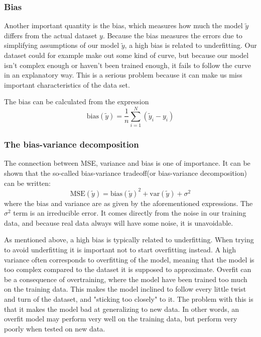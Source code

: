 \documentclass{emulateapj}
\begin{document}
\subsubsection{Bias}
Another important quantity is the bias, which measures how much the model $\tilde{y}$ differs from the actual dataset $y$. Because the bias measures the errors due to simplifying assumptions of our model $\tilde{y}$, a high bias is related to underfitting. Our dataset could for example make out some kind of curve, but because our model isn't complex enough or haven't been trained enough, it fails to follow the curve in an explanatory way. This is a serious problem because it can make us miss important characteristics of the data set.

The bias can be calculated from the expression
\begin{equation}
\text{bias}(\tilde{y})=\frac{1}{n}\sum_{i=1}^N(\tilde{y}_i - y_i)
\end{equation}

\subsubsection{The bias-variance decomposition}
The connection between MSE, variance and bias is one of importance. It can be shown that the so-called bias-variance tradeoff(or bias-variance decomposition) can be written:
\begin{equation}
\text{MSE}(\tilde{y})=\text{bias}(\tilde{y})^2 + \text{var}(\tilde{y}) +\sigma^2
\end{equation}
where the bias and variance are as given by the aforementioned expressions. The $\sigma^2$ term is an irreducible error. It comes directly from the noise in our training data, and because real data always will have some noise, it is unavoidable.\newline

As mentioned above, a high bias is typically related to underfitting. When trying to avoid underfitting it is important not to start overfitting instead.
A high variance often corresponds to overfitting of the model, meaning that the model is too complex compared to the dataset it is supposed to approximate. Overfit can be a consequence of overtraining, where the model have been trained too much on the training data. This makes the model inclined to follow every little twist and turn of the dataset, and "sticking too closely" to it. The problem with this is that it makes the model bad at generalizing to new data. In other words, an overfit model may perform very well on the training data, but perform very poorly when tested on new data.
\end{document}
